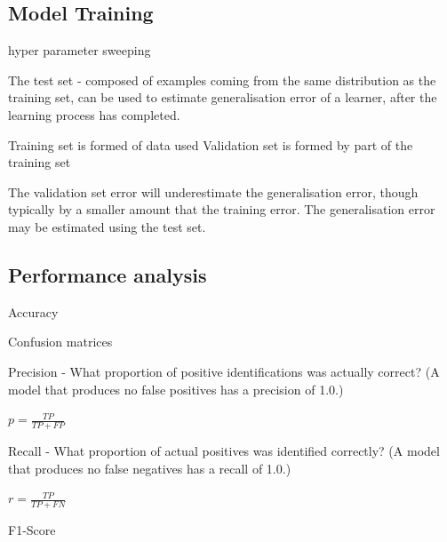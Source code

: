 \subsection{Model Training}

hyper parameter sweeping

The test set - composed of examples coming from the same distribution as the training set, can be used to estimate generalisation error of a learner, after the learning process has completed.\cite{Goodfellow2015}

Training set is formed of data used 
Validation set is formed by part of the training set

The validation set error will underestimate the generalisation error, though typically by a smaller amount that the training error. The generalisation error may be estimated using the test set.\cite{Goodfellow2015}

\subsection{Performance analysis}
Accuracy

Confusion matrices

Precision - What proportion of positive identifications was actually correct? (A model that produces no false positives has a precision of 1.0.)

$p = \frac{TP}{TP + FP} $

Recall - What proportion of actual positives was identified correctly? (A model that produces no false negatives has a recall of 1.0.)

$r = \frac{TP}{TP + FN}$

F1-Score
